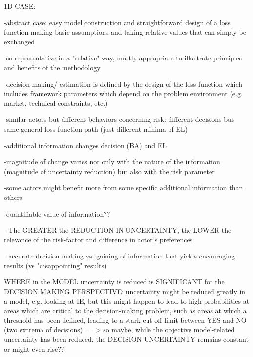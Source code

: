 	1D CASE:
	
				-abstract case: easy model construction and straightforward design of a loss function making basic assumptions and taking relative values that can simply be exchanged
			
				-so representative in a "relative" way, mostly appropriate to illustrate principles and benefits of the methodology
				
				-decision making/ estimation is defined by the design of the loss function which includes framework parameters which depend on the problem environment (e.g. market, technical constraints, etc.)
			
				-similar actors but different behaviors concerning risk: different decisions but same general loss function path (just different minima of EL)
			
				-additional information changes decision (BA) and EL
			
				-magnitude of change varies not only with the nature of the information (magnitude of uncertainty reduction) but also with the risk parameter
			
				-some actors might benefit more from some specific additional information than others
			
				-quantifiable value of information??
				
				
				
				
				- The GREATER the REDUCTION IN UNCERTAINTY, the LOWER the relevance of the risk-factor and difference in actor's preferences
				
				- accurate decision-making vs. gaining of information that yields encouraging results (vs "disappointing" results)
				
				
				
	WHERE in the MODEL uncertainty is reduced is SIGNIFICANT for the DECISION MAKING PERSPECTIVE:
	uncertainty might be reduced greatly in a model, e.g. looking at IE,
	but this might happen to lead to high probabilities at areas which are critical to the decision-making problem, such as areas at which a threshold has been defined, leading to a stark cut-off limit between YES and NO (two extrema of decisions)
	==> so maybe, while the objective model-related uncertainty has been reduced, the DECISION UNCERTAINTY remains constant or might even rise??